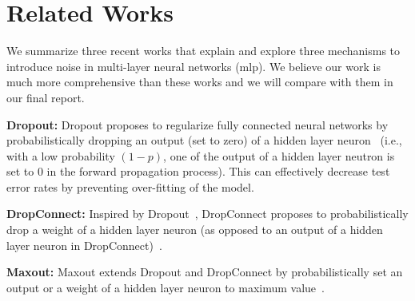 \section{Related Works}
\label{sec:related}

We summarize three recent works that explain and explore three mechanisms to
introduce noise in multi-layer neural networks (mlp). We believe our work is
much more comprehensive than these works and we will compare with them in our
final report.

{\bf Dropout:}
Dropout proposes to regularize fully connected neural networks by
probabilistically dropping an output (set to zero) of a hidden layer
neuron~\cite{hinton2012improving} (i.e., with a low probability $(1-p)$, one of
the output of a hidden layer neutron is set to $0$ in the forward propagation
process).  This can effectively decrease test error rates by preventing
over-fitting of the model.

{\bf DropConnect:}
Inspired by Dropout~\cite{hinton2012improving}, DropConnect proposes to
probabilistically drop a weight of a hidden layer neuron (as opposed to an
output of a hidden layer neuron in DropConnect)~\cite{wan2013dropconnect}.

{\bf Maxout:}
Maxout extends Dropout and DropConnect by probabilistically set an output or a
weight of a hidden layer neuron to maximum value~\cite{goodfellow13maxout}.

